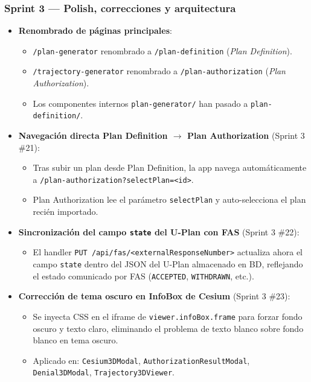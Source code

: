 \documentclass[12pt,a4paper]{article}
\begin{document}
\subsubsection*{Sprint 3 --- Polish, correcciones y arquitectura}
\begin{itemize}
    \item \textbf{Renombrado de páginas principales}:
    \begin{itemize}
        \item \texttt{/plan-generator} renombrado a \texttt{/plan-definition} (\textit{Plan Definition}).
        \item \texttt{/trajectory-generator} renombrado a \texttt{/plan-authorization} (\textit{Plan Authorization}).
        \item Los componentes internos \texttt{plan-generator/} han pasado a \texttt{plan-definition/}.
    \end{itemize}
    \item \textbf{Navegación directa Plan Definition $\rightarrow$ Plan Authorization} (Sprint 3 \#21):
    \begin{itemize}
        \item Tras subir un plan desde Plan Definition, la app navega automáticamente a \texttt{/plan-authorization?selectPlan=<id>}.
        \item Plan Authorization lee el parámetro \texttt{selectPlan} y auto-selecciona el plan recién importado.
    \end{itemize}
    \item \textbf{Sincronización del campo \texttt{state} del U-Plan con FAS} (Sprint 3 \#22):
    \begin{itemize}
        \item El handler \texttt{PUT /api/fas/<externalResponseNumber>} actualiza ahora el campo \texttt{state} dentro del JSON del U-Plan almacenado en BD, reflejando el estado comunicado por FAS (\texttt{ACCEPTED}, \texttt{WITHDRAWN}, etc.).
    \end{itemize}
    \item \textbf{Corrección de tema oscuro en InfoBox de Cesium} (Sprint 3 \#23):
    \begin{itemize}
        \item Se inyecta CSS en el iframe de \texttt{viewer.infoBox.frame} para forzar fondo oscuro y texto claro, eliminando el problema de texto blanco sobre fondo blanco en tema oscuro.
        \item Aplicado en: \texttt{Cesium3DModal}, \texttt{AuthorizationResultModal}, \texttt{Denial3DModal}, \texttt{Trajectory3DViewer}.

\end{itemize}
\end{itemize}
\end{document}
